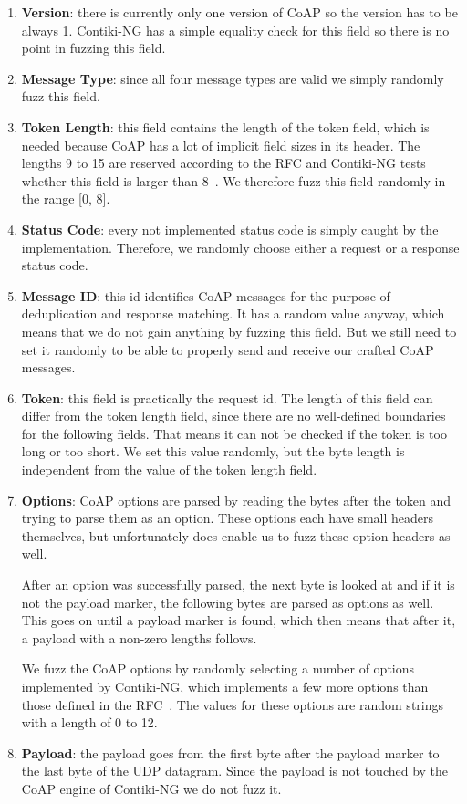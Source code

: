 \begin{enumerate}
	\item \textbf{Version}: there is currently only one version of CoAP so the version has to be always 1. Contiki-NG has a simple equality check for this field so there is no point in fuzzing this field.
	\item \textbf{Message Type}: since all four message types are valid we simply randomly fuzz this field.
	\item \textbf{Token Length}: this field contains the length of the token field, which is needed because CoAP has a lot of implicit field sizes in its header. The lengths 9 to 15 are reserved according to the RFC and Contiki-NG tests whether this field is larger than 8~\cite{RFC7252}. We therefore fuzz this field randomly in the range [0, 8].
	\item \textbf{Status Code}: every not implemented status code is simply caught by the implementation. Therefore, we randomly choose either a request or a response status code.
	\item \textbf{Message ID}: this id identifies CoAP messages for the purpose of deduplication and response matching. It has a random value anyway, which means that we do not gain anything by fuzzing this field. But we still need to set it randomly to be able to properly send and receive our crafted CoAP messages.
	\item \textbf{Token}: this field is practically the request id. The length of this field can differ from the token length field, since there are no well-defined boundaries for the following fields. That means it can not be checked if the token is too long or too short. We set this value randomly, but the byte length is independent from the value of the token length field.
	\item \textbf{Options}: CoAP options are parsed by reading the bytes after the token and trying to parse them as an option. These options each have small headers themselves, but unfortunately \scapy does enable us to fuzz these option headers as well.

	After an option was successfully parsed, the next byte is looked at and if it is not the payload marker, the following bytes are parsed as options as well. This goes on until a payload marker is found, which then means that after it, a payload with a non-zero lengths follows.

	We fuzz the CoAP options by randomly selecting a number of options implemented by Contiki-NG, which implements a few more options than those defined in the RFC~\cite{RFC7252}. The values for these options are random strings with a length of 0 to 12.
	\item \textbf{Payload}: the payload goes from the first byte after the payload marker to the last byte of the UDP datagram. Since the payload is not touched by the CoAP engine of Contiki-NG we do not fuzz it.
\end{enumerate}

